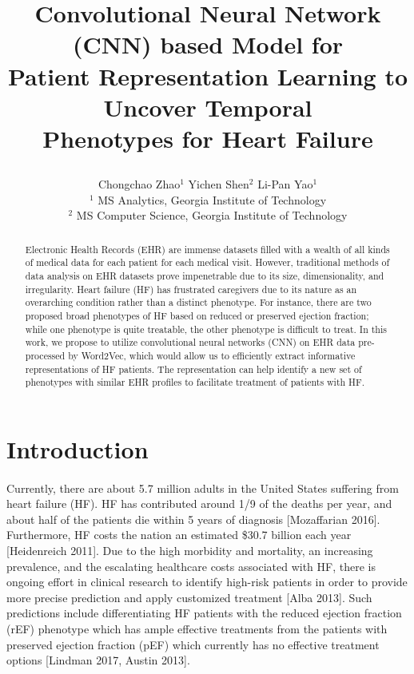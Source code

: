 \documentclass[11pt]{article}
\begin{document}
	
	\title{\textbf{Convolutional Neural Network (CNN) based Model for\\
			 Patient Representation Learning to Uncover Temporal\\ Phenotypes for Heart Failure}%
		\date{}
		\author{
			Chongchao Zhao$^1$ \quad Yichen Shen$^2$ \quad Li-Pan Yao$^1$\\
			$^1$ MS Analytics, Georgia Institute of Technology\\
			$^2$ MS Computer Science, Georgia Institute of Technology
		} %
	}

	
	\maketitle
	\begin{abstract}
		Electronic Health Records (EHR) are immense datasets filled with a wealth of all kinds of medical data for each patient for each medical visit. However, traditional methods of data analysis on EHR datasets prove impenetrable due to its size, dimensionality, and irregularity. Heart failure (HF) has frustrated caregivers due to its nature as an overarching condition rather than a distinct phenotype. For instance, there are two proposed broad phenotypes of HF based on reduced or preserved ejection fraction; while one phenotype is quite treatable, the other phenotype is difficult to treat. In this work, we propose to utilize convolutional neural networks (CNN) on EHR data pre-processed by Word2Vec, which would allow us to efficiently extract informative representations of HF patients. The representation can help identify a new set of phenotypes with similar EHR profiles to facilitate treatment of patients with HF.
	\end{abstract}
	
	
	
	\section{Introduction}
	\label{sec:intro}
	\paragraph{}
	Currently, there are about 5.7 million adults in the United States suffering from heart failure (HF). HF has contributed around 1/9 of the deaths per year, and about half of the patients die within 5 years of diagnosis [Mozaffarian 2016]. Furthermore, HF costs the nation an estimated \$30.7 billion each year [Heidenreich 2011]. Due to the high morbidity and mortality, an increasing prevalence, and the escalating healthcare costs associated with HF, there is ongoing effort in clinical research to identify high-risk patients in order to provide more precise prediction and apply customized treatment [Alba 2013]. Such predictions include differentiating HF patients with the reduced ejection fraction (rEF) phenotype which has ample effective treatments from the patients with preserved ejection fraction (pEF) which currently has no effective treatment options [Lindman 2017, Austin 2013].
	
\end{document}
